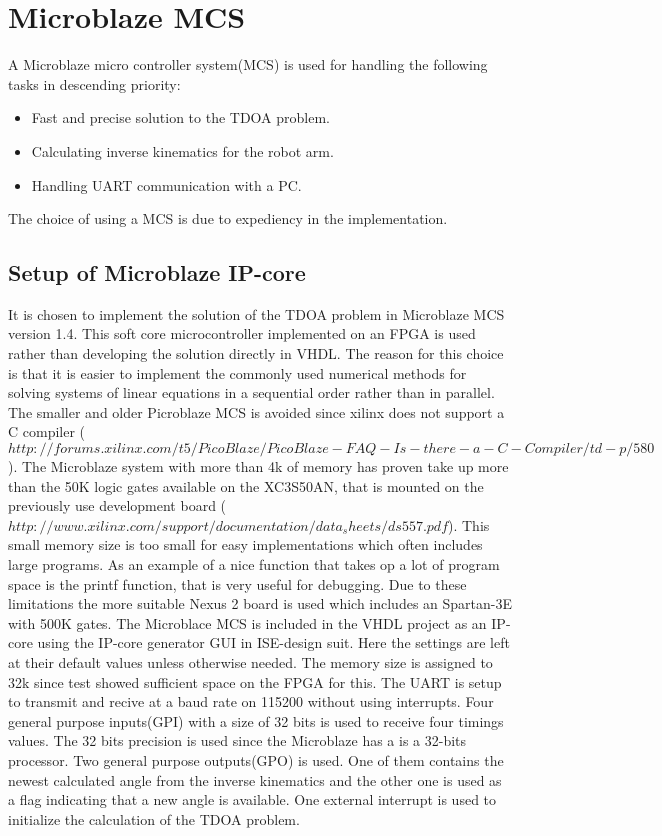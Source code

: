\section{Microblaze MCS}
A Microblaze micro controller system(MCS) is used for handling the following tasks in descending priority:
\begin{itemize}
	\item Fast and precise solution to the TDOA problem.
	\item Calculating inverse kinematics for the robot arm.
	\item Handling UART communication with a PC.
\end{itemize}
The choice of using a MCS is due to expediency in the implementation.
%
\subsection{Setup of Microblaze IP-core} 
It is chosen to implement the solution of the TDOA problem in Microblaze MCS version 1.4. This soft core microcontroller implemented on an FPGA is used rather than developing the solution directly in VHDL. 
The reason for this choice is that it is easier to implement the commonly used numerical methods for solving systems of linear equations in a sequential order rather than in parallel. 
The smaller and older Picroblaze MCS is avoided since xilinx does not support a C compiler  
($http://forums.xilinx.com/t5/PicoBlaze/PicoBlaze-FAQ-Is-there-a-C-Compiler/td-p/580$). 
The Microblaze system with more than 4k of memory has proven take up more than the 50K logic gates available on the XC3S50AN, that is mounted on the previously use development board ($http://www.xilinx.com/support/documentation/data_sheets/ds557.pdf$). 
This small memory size is too small for easy implementations which often includes large programs. As an example of a nice function that takes op a lot of program space is the printf function, that is very useful for debugging.
Due to these limitations the more suitable Nexus 2 board is used which includes an Spartan-3E with 500K gates.  
%
The Microblace MCS is included in the VHDL project as an IP-core using the IP-core generator GUI in ISE-design suit. Here the settings are left at their default values unless otherwise needed. The memory size is assigned to 32k since test showed sufficient space on the FPGA for this. The UART is setup to transmit and recive at a baud rate on 115200 without using interrupts. Four general purpose inputs(GPI) with a size of 32 bits is used to receive four timings values. The 32 bits precision is used since the Microblaze has a is a 32-bits processor. Two general purpose outputs(GPO) is used. One of them contains the newest calculated angle from the inverse kinematics and the other one is used as a flag indicating that a new angle is available. One external interrupt is used to initialize the calculation of the TDOA problem. 
%
